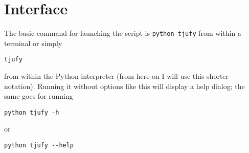 \section{Interface} %
\label{sec:interface}

The basic command for launching the script is \texttt{python tjufy} from within
a terminal or simply \begin{center}\texttt{tjufy}\end{center} from within the
Python interpreter (from here on I will use this shorter notation). Running it
without options like this will display a help dialog; the same goes for running
\begin{center}\texttt{python tjufy -h}\end{center} or
\begin{center}\texttt{python tjufy -{}-help}\end{center}



